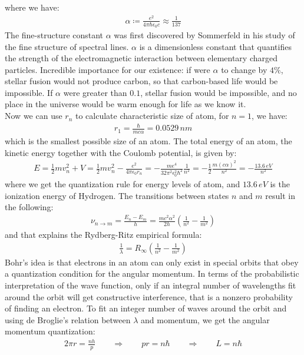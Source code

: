 \documentclass[11pt]{article}
\theoremstyle{break}
\theoremstyle{break}
\begin{document}
where we have:
\begin{align*}
\alpha \coloneqq \frac{e^2}{4\pi \hbar \epsilon_0 c} \approx \frac{1}{137}
\end{align*}
The fine-structure constant $\alpha$ was first discovered by Sommerfeld in his study of the fine structure of spectral lines. $\alpha$ is a dimensionless constant that quantifies the strength of the electromagnetic interaction between elementary charged particles. Incredible importance for our existence: if were $\alpha$ to change by $4\%$, stellar fusion would not produce carbon, so that carbon-based life would be impossible. If $\alpha$ were greater than $0.1$, stellar fusion would be impossible, and no place in the universe would be warm enough for life as we know it.\\

Now we can use $r_n$ to calculate characteristic size of atom, for $n=1$, we have:
\begin{align*}
r_1 = \frac{\hbar}{mc\alpha} = 0.0529\, nm
\end{align*}
which is the smallest possible size of an atom. The total energy of an atom, the kinetic energy together with the Coulomb potential, is given by:
\begin{align*}
E = \frac{1}{2}mv_n^2 + V = \frac{1}{2}mv_n^2 - \frac{e^2}{4\pi \epsilon_0 r_n} = -\frac{me^4}{32\pi^2 \epsilon_0^2 \hbar^2}\frac{1}{n^2} = -\frac{1}{2}\frac{m(c\alpha)^2}{n^2} = -\frac{13.6\, eV}{n^2}
\end{align*}
where we get the quantization rule for energy levels of atom, and $13.6\, eV$ is the ionization energy of Hydrogen. The transitions between states $n$ and $m$ result in the following:
\begin{align*}
\nu_{n \to m} = \frac{E_n - E_m}{h} = \frac{mc^2\alpha^2}{2h}\left( \frac{1}{n^2} - \frac{1}{m^2}\right)
\end{align*}
and that explains the Rydberg-Ritz empirical formula:
\begin{align*}
\frac{1}{\lambda} = R_{\infty}\left( \frac{1}{n^2} - \frac{1}{m^2}\right)
\end{align*}
Bohr's idea is that electrons in an atom can only exist in special orbits that obey a quantization condition for the angular momentum.
In terms of the probabilistic interpretation of  the wave function, only  if  an  integral number  of  wavelengths  fit around the orbit will get constructive interference, that is a  nonzero  probability of finding an electron. To fit an integer number of waves around the orbit and using de Broglie's relation between $\lambda$ and momentum, we get the angular momentum quantization:
\begin{align*}
2\pi r = \frac{nh}{p} \qquad \Rightarrow \qquad pr = n\hbar \qquad \Rightarrow \qquad L = n\hbar
\end{align*}
\end{document}
